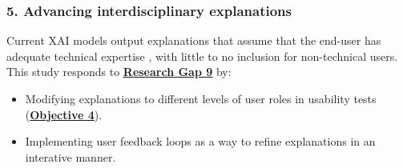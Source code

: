 
\subsubsection*{5. Advancing interdisciplinary explanations}
Current XAI models output explanations that assume that the end-user has adequate technical expertise \citep{greco2023explaining}, with little to no inclusion for non-technical users. This study responds to \hyperref[research-gap-9]{\uline{\textbf{Research Gap 9}}} by:

\begin{itemize}
  \item Modifying explanations to different levels of user roles in usability tests (\hyperref[objective-4]{\uline{\textbf{Objective 4}}}).
  \item Implementing user feedback loops as a way to refine explanations in an interative manner.
\end{itemize}

